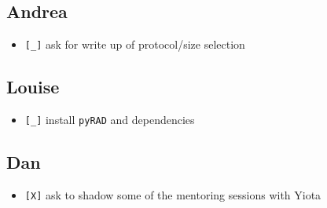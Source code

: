 \documentclass[letterpaper]{scrartcl}
\begin{document}
\subsection{Andrea}\label{andrea}

\begin{itemize}
\itemsep1pt\parskip0pt
\item
  \texttt{{[}\_{]}} ask for write up of protocol/size selection
\end{itemize}

\subsection{Louise}\label{louise}

\begin{itemize}
\itemsep1pt\parskip0pt
\item
  \texttt{{[}\_{]}} install \texttt{pyRAD} and dependencies
\end{itemize}

\subsection{Dan}\label{dan}

\begin{itemize}
\itemsep1pt\parskip0pt
\item
  \texttt{{[}X{]}} ask to shadow some of the mentoring sessions with
  Yiota
\end{itemize}
\end{document}
